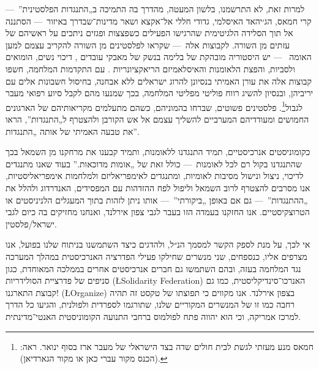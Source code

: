 למרות זאת, לא התרשמנו, בלשון המעטה, מהדרך בה התמיכה ב„התנגדות הפלסטינית”~— קרי חמאס, הג׳יהאד האיסלמי, גדודי חללי אל־אקצא ושאר מדינות־שבדרך  באיזור~— הסתננה אל תוך הסלידה הלגיטימית שהרגישו הפעילים כשפצצות ופגזים ניתכים  על ראשיהם של עזתים מן השורה. לקבוצות אלה~— שקראו לפלסטינים מן השורה להקריב עצמם למען האומה ~— יש היסטוריה מובהקת של בלימה בנשק של מאבקי עובדים , דיכוי נשים, הומואים ולסביות, והפצת הלאומנות והאיסלאמיזם  הריאקציונריות . עם התקדמות המלחמה, חשפו קבוצות אלה את עורן האמיתי בנסיונן להרוג ישראלים ללא אבחנה, בחיסול חשבונות אלים  עם יריביהן, ובנסיון להשיג רווח פוליטי מפליטי המלחמה, בכך שמנעו מהם לקבל סיוע רפואי מעבר לגבול\footnote{חמאס מנע מעזתי לגשת לבית חולים שדה בצד הישראלי של מעבר ארז בסוף ינואר. ראה: (הכנס מקור עברי כאן או מקור הגארדיאן).}. פלסטינים פשוטים, שברחו בהמוניהם, כשהם מתעלמים מקריאותיהם של הארגונים החמושים ומעודדיהם המערביים להשליך עצמם אל אש הקורבן ולהצטרף ל„התנגדות”, הראו את טבעה האמיתי של אותה „התנגדות”.

כקומוניסטים אנרכיסטיים, תמיד התנגדנו ללאומנות, ותמיד קבענו את מרחקנו מן השמאל בכך שהתנגדנו בקול רם  לכל לאומנות~— כולל זאת של „אומות מדוכאות.” בעוד שאנו מתנגדים לדיכוי, ניצול ונישול מסיבות לאומיות, ומתנגדים לאימפריאליזם ולמלחמות אימפריאליסטיות, אנו מסרבים להצטרף לרוב השמאל וליפול לפח ההזדהות עם המפסידים, האנדרדוג ולהלל את „ההתנגדות”~— גם אם באופן „ביקורתי”~— אותו ניתן לזהות בתוך המעגלים הלניניסטים או הטרוצקיסטיים. אנו החזקנו בעמדה הזו בעבר לגבי צפון אירלנד, ואנחנו מחזיקים בה כיום לגבי ישראל/פלסטין.

אי לכך, על מנת לספק הקשר למסמך הנ״ל, ולהדגים כיצד השתמשנו בניתוח שלנו בפועל, אנו מצרפים אליו, כנספחים, שני מנשרים שחילקו פעילי הפדרציה האנרכיסטית במהלך המערכה נגד המלחמה בעזה, ובהם השתמשו גם חברים אנרכיסטים אחרים בממלכה המאוחדת, כגון סניפים של פדרציית הסולידריות (\L{Solidarity Federation}) האנרכו־סינדיקליסטית, כמו גם קבוצת התארגנו! (\L{Organize}) בצפון אירלנד. אנו מקווים כי תפוצתו של טקסט זה תהיה רחבה כמו זו של המנשרים המקוריים שלנו, שתורגמו לספרדית ולפולנית, והגיעו כל הדרך למרכז אמריקה, וכי הוא יהווה פתח לפולמוס ברחבי התנועה הקומוניסטית האנטי־מדינתית.

